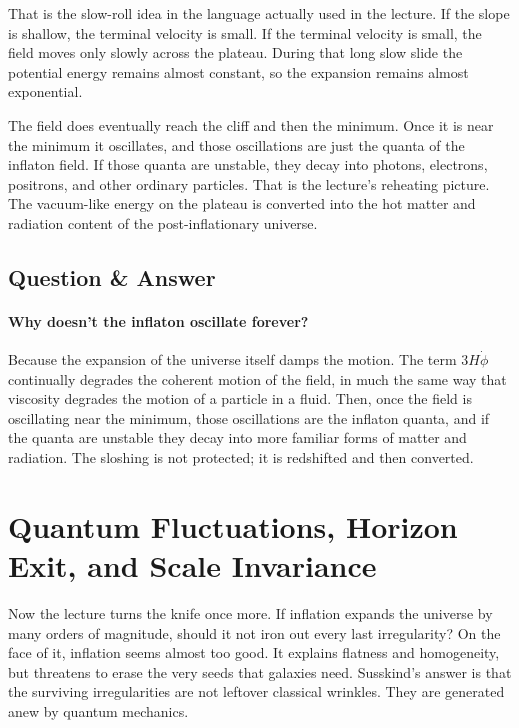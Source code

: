 That is the slow-roll idea in the language actually used in the lecture. If the slope is shallow, the terminal velocity is small. If the terminal velocity is small, the field moves only slowly across the plateau. During that long slow slide the potential energy remains almost constant, so the expansion remains almost exponential.

The field does eventually reach the cliff and then the minimum. Once it is near the minimum it oscillates, and those oscillations are just the quanta of the inflaton field. If those quanta are unstable, they decay into photons, electrons, positrons, and other ordinary particles. That is the lecture's reheating picture. The vacuum-like energy on the plateau is converted into the hot matter and radiation content of the post-inflationary universe.

\subsection{Question \& Answer}

\paragraph{Why doesn't the inflaton oscillate forever?}

Because the expansion of the universe itself damps the motion. The term \(3H\dot\phi\) continually degrades the coherent motion of the field, in much the same way that viscosity degrades the motion of a particle in a fluid. Then, once the field is oscillating near the minimum, those oscillations are the inflaton quanta, and if the quanta are unstable they decay into more familiar forms of matter and radiation. The sloshing is not protected; it is redshifted and then converted.

\section{Quantum Fluctuations, Horizon Exit, and Scale Invariance}

Now the lecture turns the knife once more. If inflation expands the universe by many orders of magnitude, should it not iron out every last irregularity? On the face of it, inflation seems almost too good. It explains flatness and homogeneity, but threatens to erase the very seeds that galaxies need. Susskind's answer is that the surviving irregularities are not leftover classical wrinkles. They are generated anew by quantum mechanics.

